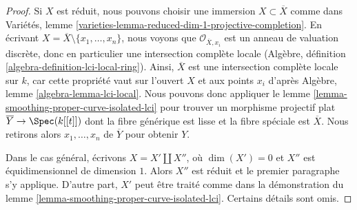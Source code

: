 \begin{proof}
Si $X$ est réduit, nous pouvons choisir une immersion
$X \subset \overline{X}$ comme dans
Variétés, lemme \ref{varieties-lemma-reduced-dim-1-projective-completion}.
En écrivant $X = \overline{X} \setminus \{x_1, \ldots, x_n\}$,
nous voyons que $\mathcal{O}_{\overline{X}, x_i}$ est un anneau de
valuation discrète, donc en particulier une intersection complète locale
(Algèbre, définition \ref{algebra-definition-lci-local-ring}).
Ainsi, $\overline{X}$ est une intersection complète locale
sur $k$, car cette propriété vaut sur l'ouvert $X$ et
aux points $x_i$ d'après Algèbre, lemme \ref{algebra-lemma-lci-local}.
Nous pouvons donc appliquer le lemme \ref{lemma-smoothing-proper-curve-isolated-lci}
pour trouver un morphisme projectif plat $\overline{Y} \to \Spec(k[[t]])$
dont la fibre générique est lisse et la fibre spéciale
est $\overline{X}$. Nous retirons alors $x_1, \ldots, x_n$
de $\overline{Y}$ pour obtenir $Y$.

\medskip\noindent
Dans le cas général, écrivons $X = X' \amalg X''$, où
$\dim(X') = 0$ et $X''$ est équidimensionnel de dimension $1$.
Alors $X''$ est réduit et le premier paragraphe s'y applique.
D'autre part, $X'$ peut être traité
comme dans la démonstration du lemme \ref{lemma-smoothing-proper-curve-isolated-lci}.
Certains détails sont omis.
\end{proof}











